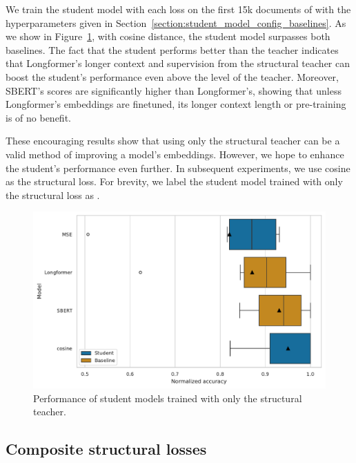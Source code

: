 We train the student model with each loss on the first 15k documents of
 with the hyperparameters given in
Section~\ref{section:student_model_config_baselines}. As we show in
Figure~\ref{fig:structural_basic}, with cosine distance, the student model
surpasses both baselines. The fact that the student performs better
than the teacher indicates that Longformer's longer context and supervision from
the structural teacher can boost the student's performance even above the level
of the teacher. Moreover, SBERT's scores are significantly higher than
Longformer's, showing that unless Longformer's embeddings are finetuned, its
longer context length or pre-training is of no benefit.

These encouraging results show that using only the structural teacher can be a
valid method of improving a model's embeddings. However, we hope to
enhance the student's performance even further. In subsequent experiments, we
use cosine as the structural loss. For brevity, we label the student model
trained with only the structural loss as .

\begin{figure}
  \includegraphics[width=\textwidth]{img/structural_simple_losses.pdf}

  \caption{Performance of student models trained with only the structural
  teacher.}

  \label{fig:structural_basic}
\end{figure}

\subsection{Composite structural losses}\label{section:composite_losses}

